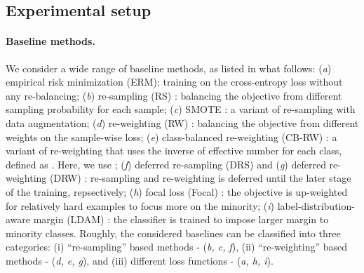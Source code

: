 \subsection{Experimental setup}
\label{ss:setup}

\paragraph{Baseline methods.}
We consider a wide range of baseline methods, as listed in what follows: 
(\textit{a}) empirical risk minimization (ERM): training on the cross-entropy loss without any re-balancing; 
(\textit{b}) re-sampling (RS) \citealt{japkowicz2000class}: balancing the objective from different sampling probability for each sample; 
(\textit{c}) SMOTE \citep{chawla2002smote}: a variant of re-sampling with data augmentation;
(\textit{d}) re-weighting (RW) \citealt{huang2016learning}: balancing the objective from different weights on the sample-wise loss;
(\textit{e}) class-balanced re-weighting (CB-RW) \citealt{cui2019class}: a variant of re-weighting that uses the inverse of effective number for each class, defined as \mbox{}. Here, we use ;
(\textit{f}) deferred re-sampling (DRS) \citealt{cao2019learning} and (\textit{g}) deferred re-weighting (DRW) \citealt{cao2019learning}: re-sampling and re-weighting is deferred until the later stage of the training, repsectively;
(\textit{h}) focal loss (Focal) \citealt{lin2017focal}: the objective is up-weighted for relatively hard examples to focus more on the minority; 
(\textit{i}) label-distribution-aware margin (LDAM) \citealt{cao2019learning}: the classifier is trained to impose larger margin to minority classes. 
Roughly, the considered baselines can be classified into three categories: (i) ``re-sampling'' based methods - (\textit{b, c, f}), (ii) ``re-weighting'' based methods - (\textit{d, e, g}), and (iii) different loss functions - (\textit{a, h, i}). 

\vspace{-0.15in}
